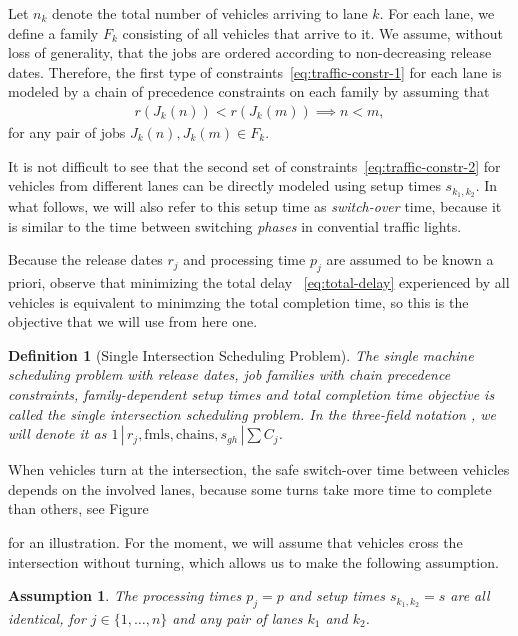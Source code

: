 \documentclass{article}
\newcommand{\inline}[1]{ {\color{blue}{#1}}\addcontentsline{tdo}{todo}{#1}}
\theoremstyle{definition}
\theoremstyle{plain}
\newtheorem{define}{Definition}[section]
\newtheorem{assump}{Assumption}[section]
\begin{document}
Let $n_{k}$ denote the total number of vehicles arriving to lane $k$. For each
lane, we define a family $F_{k}$ consisting of all vehicles that arrive to it.
We assume, without loss of generality, that the jobs are ordered according to
non-decreasing release dates. Therefore, the first type of
constraints~\eqref{eq:traffic-constr-1} for each lane is modeled by a chain
of precedence constraints on each family by assuming that
\begin{align*}
  r(J_{k}(n)) < r(J_{k}(m)) \implies n < m ,
\end{align*}
for any pair of jobs $J_{k}(n), J_{k}(m) \in F_{k}$.

It is not difficult to see
that the second set of constraints~\eqref{eq:traffic-constr-2} for vehicles from
different lanes can be directly modeled using setup times $s_{k_{1},k_{2}}$. In
what follows, we will also refer to this setup time as \textit{switch-over}
time, because it is similar to the time between switching \textit{phases} in
convential traffic lights.

Because the release dates $r_{j}$ and processing time $p_{j}$ are assumed to be
known a priori, observe that minimizing the total delay ~\eqref{eq:total-delay}
experienced by all vehicles is equivalent to minimzing the total completion time,
so this is the objective that we will use from here one.

\begin{define}[Single Intersection Scheduling Problem]
  \label{def:single-problem}
  The single machine scheduling problem with release dates, job families with
  chain precedence constraints, family-dependent setup times and total
  completion time objective is called the {\normalfont single intersection
    scheduling problem}. In the three-field notation
  \cite{grahamOptimizationApproximationDeterministic1979}, we will denote it as
  $1 \, | \, r_{j}, \text{fmls}, \text{chains}, s_{gh} \, | \sum C_{j}$.
\end{define}

When vehicles turn at the intersection, the safe switch-over time between
vehicles depends on the involved lanes, because some turns take more time to
complete than others, see Figure\inline{(see Figure
  13 in Limpens' report)} for an illustration. For the moment, we will assume that vehicles cross
the intersection without turning, which allows us to make the following
assumption.

\begin{assump}
  \label{assump1}
  The processing times $p_{j} = p$ and setup times $s_{k_{1},k_{2}} = s$ are all
  identical, for $j \in \{1, \dots, n\}$ and any pair of lanes $k_{1}$ and
  $k_{2}$.
\end{assump}
\end{document}

